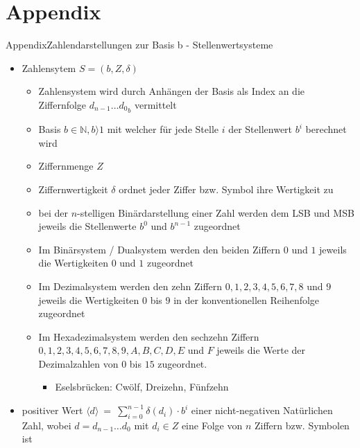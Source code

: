 
\section{Appendix}

\begin{frame}[allowframebreaks]{Appendix}{Zahlendarstellungen zur Basis b - Stellenwertsysteme}
  \begin{itemize}
    \item \alert{Zahlensytem} $S = (b, Z, \delta)$
    \begin{itemize}
  \item Zahlensystem wird durch Anhängen der \alert{Basis als Index} an die Ziffernfolge ${d_{n-1}\ldots d_{0}}_b$ vermittelt
      \item \alert{Basis} $b\in\mathbb{N}, b\rangle 1$ mit welcher für jede \alert{Stelle} $i$ der \alert{Stellenwert} $b^i$ berechnet wird
      \item \alert{Ziffernmenge} $Z$
      \item \alert{Ziffernwertigkeit} $\delta$ ordnet jeder \alert{Ziffer} bzw. Symbol ihre \alert{Wertigkeit} zu
    \end{itemize}
    \begin{Sidenote}
      \begin{itemize}
        \item bei der $n$-stelligen Binärdarstellung einer Zahl werden dem \alert{LSB} und \alert{MSB} jeweils die Stellenwerte $b^0$ und $b^{n-1}$ zugeordnet
        \item Im \alert{Binärsystem / Dualsystem} werden den beiden Ziffern $0$ und $1$ jeweils die Wertigkeiten $0$ und $1$ zugeordnet
        \item Im \alert{Dezimalsystem} werden den zehn Ziffern $0, 1, 2, 3, 4, 5, 6, 7, 8$ und $9$ jeweils die Wertigkeiten $0$ bis $9$ in der konventionellen Reihenfolge zugeordnet
        \item Im \alert{Hexadezimalsystem} werden den sechzehn Ziffern $0, 1, 2, 3, 4, 5, 6, 7, 8, 9, A, B, C, D, E$ und $F$ jeweils die Werte der Dezimalzahlen von $0$ bis $15$ zugeordnet.
        \begin{itemize}
          \item \alert{Eselsbrücken:} \alert{C}wölf, \alert{D}reizehn, \alert{F}ünfzehn
        \end{itemize}
    \end{itemize}
\end{Sidenote}
    \item \alert{positiver Wert} $\displaystyle \langle d\rangle\ =\ \sum_{i=0}^{n-1} \delta(d_{i})\cdot b^{i}$ einer \alert{nicht-negativen Natürlichen Zahl}, wobei $d=d_{n-1}\ldots d_0$ mit $d_i\in Z$ eine \alert{Folge} von $n$ \alert{Ziffern} bzw. Symbolen ist
  \end{itemize}
\end{frame}

